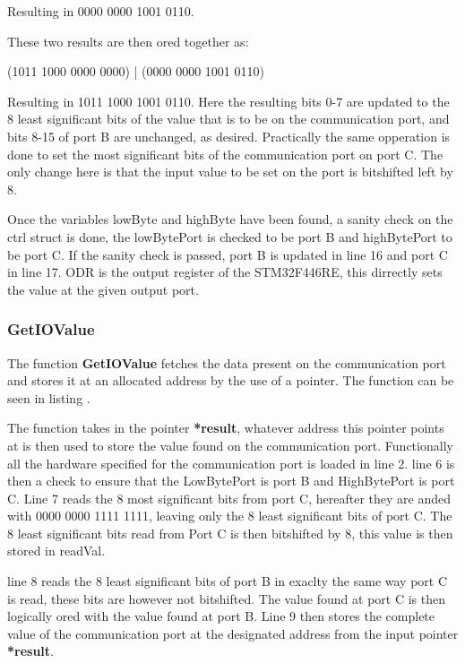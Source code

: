 Resulting in 0000 0000 1001 0110. 

These two results are then ored together as:

(1011 1000 0000 0000) | (0000 0000 1001 0110) 

Resulting in 1011 1000 1001 0110. Here the resulting bits 0-7 are updated to the 8 least significant bits of the value that is to be on the communication port, and bits 8-15 of port B are unchanged, as desired. Practically the same opperation is done to set the most significant bits of the communication port on port C. The only change here is that the input value to be set on the port is bitshifted left by 8.

Once the variables lowByte and highByte have been found, a sanity check on the ctrl struct is done, the lowBytePort is checked to be port B and highBytePort to be port C. If the sanity check is passed, port B is updated in line 16 and port C in line 17. ODR is the output register of the STM32F446RE, this dirrectly sets the value at the given output port.

\subsubsection*{GetIOValue}
The function \textbf{GetIOValue} fetches the data present on the communication port and stores it at an allocated address by the use of a pointer. The function can be seen in listing .



The function takes in the pointer \textbf{*result}, whatever address this pointer points at is then used to store the value found on the communication port. Functionally all the hardware specified for the communication port is loaded in line 2. line 6 is then a check to ensure that the LowBytePort is port B and HighBytePort is port C. Line 7 reads the 8 most significant bits from port C, hereafter they are anded with 0000 0000 1111 1111, leaving only the 8 least significant bits of port C. The 8 least significant bits read from Port C is then bitshifted by 8, this value is then stored in readVal.

line 8 reads the 8 least significant bits of port B in exaclty the same way port C is read, these bits are however not bitshifted. The value found at port C is then logically ored with the value found at port B. Line 9 then stores the complete value of the communication port at the designated address from the input pointer \textbf{*result}.

